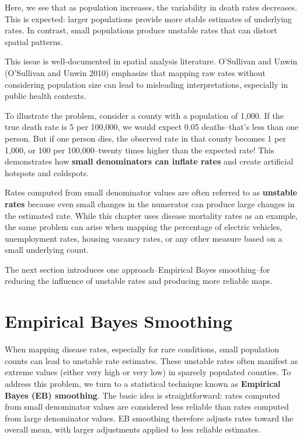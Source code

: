\documentclass[
  letterpaper,
]{book}
\begin{document}
Here, we see that as population increases, the variability in death
rates decreases. This is expected: larger populations provide more
stable estimates of underlying rates. In contrast, small populations
produce unstable rates that can distort spatial patterns.

This issue is well-documented in spatial analysis literature. O'Sullivan
and Unwin (O'Sullivan and Unwin 2010) emphasize that mapping raw rates
without considering population size can lead to misleading
interpretations, especially in public health contexts.

To illustrate the problem, consider a county with a population of 1,000.
If the true death rate is 5 per 100,000, we would expect 0.05
deaths--that's less than one person. But if one person dies, the
observed rate in that county becomes 1 per 1,000, or 100 per
100,000--twenty times higher than the expected rate! This demonstrates
how \textbf{small denominators can inflate rates} and create artificial
hotspots and coldspots.

Rates computed from small denominator values are often referred to as
\textbf{unstable rates} because even small changes in the numerator can
produce large changes in the estimated rate. While this chapter uses
disease mortality rates as an example, the same problem can arise when
mapping the percentage of electric vehicles, unemployment rates, housing
vacancy rates, or any other measure based on a small underlying count.

The next section introduces one approach--Empirical Bayes smoothing--for
reducing the influence of unstable rates and producing more reliable
maps.

\section{Empirical Bayes Smoothing}\label{empirical-bayes-smoothing}

When mapping disease rates, especially for rare conditions, small
population counts can lead to unstable rate estimates. These unstable
rates often manifest as extreme values (either very high or very low) in
sparsely populated counties. To address this problem, we turn to a
statistical technique known as \textbf{Empirical Bayes (EB) smoothing}.
The basic idea is straightforward: rates computed from small denominator
values are considered less reliable than rates computed from large
denominator values. EB smoothing therefore adjusts rates toward the
overall mean, with larger adjustments applied to less reliable
estimates.
\end{document}
